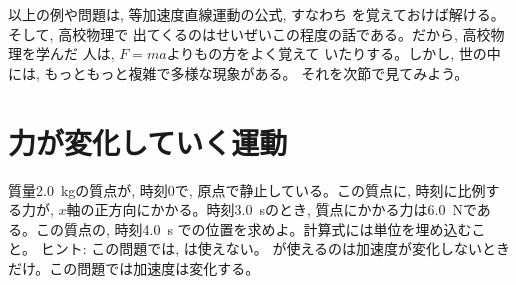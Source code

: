 以上の例や問題は, 等加速度直線運動の公式, すなわち
を覚えておけば解ける。そして, 高校物理で
出てくるのはせいぜいこの程度の話である。だから, 高校物理を学んだ
人は, $F=ma$よりもの方をよく覚えて
いたりする。しかし, 世の中には, もっともっと複雑で多様な現象がある。
それを次節で見てみよう。\\


\section{力が変化していく運動}


\begin{q}\label{q:increase_force} 質量2.0~kgの質点が, 
時刻0で, 原点で静止している。この質点に, 時刻に比例する力が, 
$x$軸の正方向にかかる。時刻3.0~sのとき, 質点にかかる力は6.0~Nである。この質点の, 時刻4.0~s
での位置を求めよ。計算式には単位を埋め込むこと。
ヒント: この問題では, は使えない。
が使えるのは加速度が変化しないとき
だけ。この問題では加速度は変化する。\end{q}
\mv











